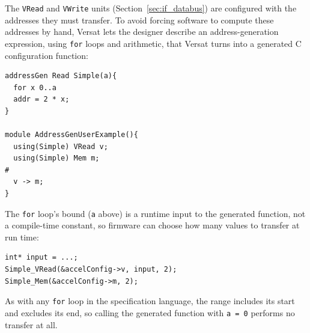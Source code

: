 %

The \texttt{VRead} and \texttt{VWrite} units (Section~\ref{sec:if_databus})
are configured with the addresses they must transfer. To avoid forcing
software to compute these addresses by hand, Versat lets the designer
describe an address-generation expression, using \texttt{for} loops and
arithmetic, that Versat turns into a generated C configuration function:

\begin{lstlisting}
addressGen Read Simple(a){
  for x 0..a
  addr = 2 * x;
}

module AddressGenUserExample(){
  using(Simple) VRead v;
  using(Simple) Mem m;
#
  v -> m;
}
\end{lstlisting}

The \texttt{for} loop's bound (\texttt{a} above) is a runtime input to the
generated function, not a compile-time constant, so firmware can choose how
many values to transfer at run time:

\begin{lstlisting}
int* input = ...;
Simple_VRead(&accelConfig->v, input, 2);
Simple_Mem(&accelConfig->m, 2);
\end{lstlisting}

As with any \texttt{for} loop in the specification language, the range
includes its start and excludes its end, so calling the generated function
with \texttt{a = 0} performs no transfer at all.
